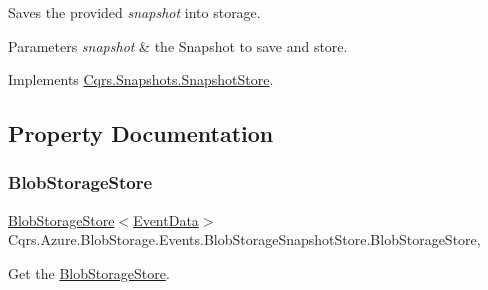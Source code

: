 Saves the provided {\itshape snapshot}  into storage. 


\begin{DoxyParams}{Parameters}
{\em snapshot} & the Snapshot to save and store.\\
\hline
\end{DoxyParams}


Implements \hyperlink{classCqrs_1_1Snapshots_1_1SnapshotStore_ae96ea2bb89a0bd7f45544acc37107525_ae96ea2bb89a0bd7f45544acc37107525}{Cqrs.\+Snapshots.\+Snapshot\+Store}.



\subsection{Property Documentation}
\mbox{\label{classCqrs_1_1Azure_1_1BlobStorage_1_1Events_1_1BlobStorageSnapshotStore_abae8311ccc1869443861c434f4090549_abae8311ccc1869443861c434f4090549}} 
\subsubsection{\texorpdfstring{Blob\+Storage\+Store}{BlobStorageStore}}
{\footnotesize\ttfamily \hyperlink{classCqrs_1_1Azure_1_1BlobStorage_1_1BlobStorageStore}{Blob\+Storage\+Store}$<$\hyperlink{classCqrs_1_1Events_1_1EventData}{Event\+Data}$>$ Cqrs.\+Azure.\+Blob\+Storage.\+Events.\+Blob\+Storage\+Snapshot\+Store.\+Blob\+Storage\+Store\hspace{0.3cm}{\ttfamily [get]}, {\ttfamily [protected]}}



Get the \hyperlink{classCqrs_1_1Azure_1_1BlobStorage_1_1BlobStorageStore}{Blob\+Storage\+Store}. 

